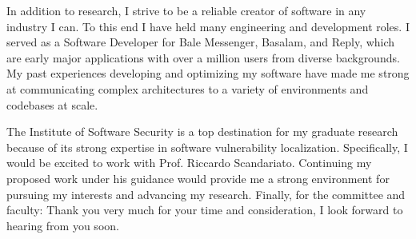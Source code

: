 \documentclass[11pt,a4paper,sans]{moderncv}
\begin{document}
In addition to research, I strive to be a reliable creator of software in any industry I can. %
To this end I have held many engineering and development roles. %
I served as a Software Developer for Bale Messenger, Basalam, and Reply, which are early major applications with over a million users from diverse backgrounds. %
My past experiences developing and optimizing my software have made me strong at communicating complex architectures to a variety of environments and codebases at scale. %

The Institute of Software Security is a top destination for my graduate research because of its strong expertise in software vulnerability localization. %
Specifically, I would be excited to work with Prof. Riccardo Scandariato. %
Continuing my proposed work under his guidance would provide me a strong environment for pursuing my interests and advancing my research. %
Finally, for the committee and faculty: Thank you very much for your time and consideration, I look forward to hearing from you soon. %

\makeletterclosing
\end{document}
